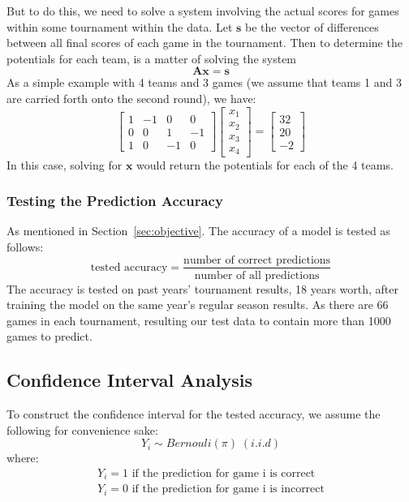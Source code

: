 \documentclass{article} %
\begin{document}
But to do this, we need to solve a system involving the actual scores for games within some tournament within the data. Let $\mathbf{s}$ be the vector of differences between all final scores of each game in the tournament. Then to determine the potentials for each team, is a matter of solving the system 
\[\mathbf{A}\mathbf{x} = \mathbf{s} \]
As a simple example with 4 teams and 3 games (we assume that teams 1 and 3 are carried forth onto the second round), we have:
\[
\begin{bmatrix}
  1&-1&0&0\\
  0&0&1&-1\\
  1&0&-1&0
\end{bmatrix}\begin{bmatrix}
  x_1\\x_2\\x_3\\x_4
\end{bmatrix} = \begin{bmatrix}
  32\\20\\-2
\end{bmatrix}
\]
In this case, solving for $\mathbf{x}$ would return the potentials for each of the 4 teams.
\subsubsection{Testing the Prediction Accuracy}
As mentioned in Section~\ref{sec:objective}. The accuracy of a model is tested as follows: 
\begin{equation}
    \mbox{tested accuracy} = \frac{\mbox{number of correct predictions}}{\mbox{number of all predictions}}
\end{equation}
The accuracy is tested on past years' tournament results, 18 years worth, after training the model on the same year's regular season results.  As there are 66 games in each tournament, resulting our test data to contain more than 1000 games to predict.


\subsection{Confidence Interval Analysis}
To construct the confidence interval for the tested accuracy, we assume the following for convenience sake:
\begin{equation}
    Y_i \sim Bernouli(\pi)\;(i.i.d)
\end{equation}
where:
\begin{equation}
    \begin{split}
        Y_i = 1 \mbox{ if the prediction for game i is correct} \\
        Y_i = 0 \mbox{ if the prediction for game i is incorrect}
    \end{split}
\end{equation}
\end{document}
